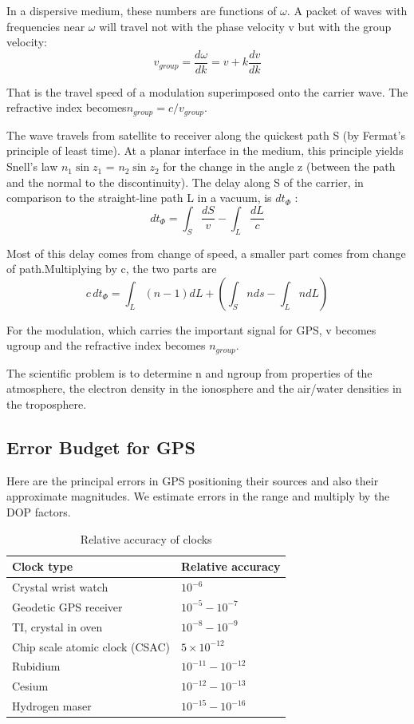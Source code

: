 		In a dispersive medium, these numbers are functions of $\omega$. A packet of waves with
		frequencies near $\omega$ will travel not with the phase velocity v but with the group velocity:
		\begin{equation}\label{eq:9.34}
			v_{group} = \dfrac{d\omega}{dk}=v+k\dfrac{dv}{dk}
		\end{equation}
		
		That is the travel speed of a modulation superimposed onto the carrier wave. The refractive index becomes$n_{group}=c/v_{group}$.
		
		The wave travels from satellite to receiver along the quickest path S (by Fermat’s principle of least time). At a planar interface in the medium, this principle yields Snell’s law $n_1\sin z_1$ = $n_2\sin z_2$ for the change in the angle z (between the path and the normal to the discontinuity). The delay along S of the carrier, in comparison to the straight-line path L in a vacuum, is $dt_\Phi$ :
		\[
			dt_\Phi = \int_S\dfrac{dS}{v}-\int_L\dfrac{dL}{c}
		\]
		
		Most of this delay comes from change of speed, a smaller part comes from change of path.Multiplying by c, the two parts are
		\begin{equation}\label{eq:9.35}
			c\,dt_\Phi=\int_L(n-1)dL+(\int_Snds-\int_LndL)
		\end{equation}
		
		For the modulation, which carries the important signal for GPS, v becomes ugroup and the refractive index becomes $n_{group}$.
		
		The scientific problem is to determine n and ngroup from properties of the atmosphere, the electron density in the ionosphere and the air/water densities in the troposphere.
	
	\subsection{Error Budget for GPS}
		Here are the principal errors in GPS positioning their sources and also their approximate magnitudes. We estimate errors in the range and multiply by the DOP factors.
		\begin{table}
			\caption{Relative accuracy of clocks}
			\label{tab:9.5}
			\begin{tabularx}{\textwidth}{ll}
				\hline
				Clock type & Relative accuracy \\
				\hline
				Crystal wrist watch & $10^{-6}$ \\
				Geodetic GPS receiver & $10^{-5}-10^{-7}$ \\
				TI, crystal in oven & $10^{-8}-10^{-9}$ \\
				Chip scale atomic clock (CSAC) & $5\times10^{-12}$ \\
				Rubidium & $10^{-11}-10^{-12}$ \\
				Cesium & $10^{-12}-10^{-13}$ \\
				Hydrogen maser & $10^{-15}-10^{-16}$ \\
				\hline
			\end{tabularx}
		\end{table}
		
